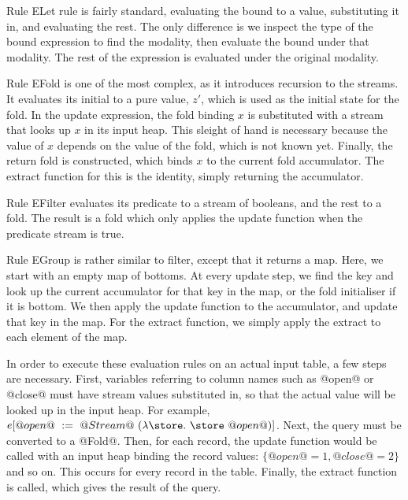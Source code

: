 Rule ELet rule is fairly standard, evaluating the bound to a value, substituting it in, and evaluating the rest.
The only difference is we inspect the type of the bound expression to find the modality, then evaluate the bound under that modality.
The rest of the expression is evaluated under the original modality.

Rule EFold is one of the most complex, as it introduces recursion to the streams.
It evaluates its initial to a pure value, $z'$, which is used as the initial state for the fold.
In the update expression, the fold binding $x$ is substituted with a stream that looks up $x$ in its input heap.
This sleight of hand is necessary because the value of $x$ depends on the value of the fold, which is not known yet.
Finally, the return fold is constructed, which binds $x$ to the current fold accumulator.
The extract function for this is the identity, simply returning the accumulator.

Rule EFilter evaluates its predicate to a stream of booleans, and the rest to a fold.
The result is a fold which only applies the update function when the predicate stream is true.

Rule EGroup is rather similar to filter, except that it returns a map.
Here, we start with an empty map of bottoms.
At every update step, we find the key and look up the current accumulator for that key in the map, or the fold initialiser if it is bottom.
We then apply the update function to the accumulator, and update that key in the map.
For the extract function, we simply apply the extract to each element of the map.

In order to execute these evaluation rules on an actual input table, a few steps are necessary.
First, variables referring to column names such as @open@ or @close@ must have stream values substituted in, so that the actual value will be looked up in the input heap.
For example, $e[@open@~:=~@Stream@~(\lam{\store} \store~@open@)]$.
Next, the query must be converted to a @Fold@.
Then, for each record, the update function would be called with an input heap binding the record values: $\{@open@ = 1, @close@ = 2\}$ and so on.
This occurs for every record in the table.
Finally, the extract function is called, which gives the result of the query.

